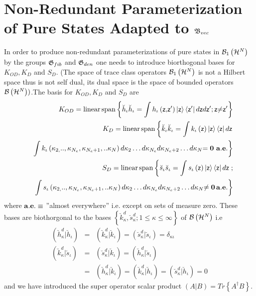 \section{Non-Redundant Parameterization of Pure States Adapted to ${\frak B}%
_{vec}$}

In order to produce non-redundant parameterizations of pure states in ${\cal %
B}_{1}\left( {\cal H}^{N}\right) $ by the groups ${\frak G}_{fib}$ and $%
{\frak G}_{den}$ one needs to introduce biorthogonal bases for $K_{OD},K_{D}$
and $S_{D}$. (The space of trace class operators ${\cal B}_{1}\left( {\cal H}%
^{N}\right) $ is not a Hilbert space thus is not self dual, its dual space
is the space of bounded operators ${\cal B}\left( {\cal H}^{N}\right) )$.The
basis for $K_{OD},K_{D}$ and $S_{D}$ are 
\begin{eqnarray}
&&K_{OD}={\rm linear\,span}\left\{ \breve{h}_{\iota }\breve{h}_{\iota }=\int
h_{\iota }\left( {\sf z}{\bf ,}{\sf z}^{\prime }\right) \left| {\sf z}%
\right\rangle \left\langle {\sf z}^{\prime }\right| d{\sf z}d{\sf z}^{\prime
};{\sf z}{\bf \neq }{\sf z}^{\prime }\right\} \\
&&K_{D}={\rm linear\,span}\left\{ \breve{k}_{\iota }\breve{k}_{\iota }=\int
k_{\iota }\left( {\sf z}\right) \left| {\sf z}\right\rangle \left\langle 
{\sf z}\right| d{\sf z}\right.  \nonumber \\
&&\left. \int k_{\iota }\left( \kappa _{2,}..,\kappa _{N_{e}},\kappa
_{N_{e}+1},..\kappa _{N}\right) d\kappa _{2}\ldots d\kappa _{N_{e}}d\kappa
_{N_{e}+2}\ldots d\kappa _{N}{\bf =0}\text{ }{\bf a.e.}\right\}
\label{kbasis} \\
&&S_{D}={\rm linear\,span}\left\{ \breve{s}_{\iota }\breve{s}_{\iota }=\int
s_{\iota }\left( {\sf z}\right) \left| {\sf z}\right\rangle \left\langle 
{\sf z}\right| d{\sf z}\right. ;  \nonumber \\
&&\left. \int s_{\iota }\left( \kappa _{2,}..,\kappa _{N_{e}},\kappa
_{N_{e}+1},..\kappa _{N}\right) d\kappa _{2}\ldots d\kappa _{N_{e}}d\kappa
_{N_{e}+2}\ldots d\kappa _{N}{\bf \neq 0\,a.e.}\right\}  \label{sbasis}
\end{eqnarray}%
where ${\bf a.e.\equiv }$ ''almost everywhere'' i.e. except on sets of
measure zero. These bases are biothorgonal to the bases $\left\{ \breve{k}%
_{\kappa }^{d},\breve{s}_{\kappa }^{d};1\leq \kappa \leq \infty \right\} $
of ${\cal B}\left( {\cal H}^{N}\right) $ i.e 
\begin{eqnarray}
\left( \breve{h}_{\kappa }^{d}|\breve{h}_{\iota }\right) &=&\left( \breve{k}%
_{\kappa }^{d}|\breve{k}_{\iota }\right) =\left( \breve{s}_{\kappa }^{d}|%
\breve{s}_{\iota }\right) =\delta _{\kappa \iota }  \nonumber \\
\left( \breve{k}_{\kappa }^{d}|\breve{s}_{\iota }\right) &=&\left( \breve{s}%
_{\kappa }^{d}|\breve{k}_{\iota }\right) =\left( \breve{h}_{\kappa }^{d}|%
\breve{s}_{\iota }\right)  \nonumber \\
&=&\left( \breve{h}_{\kappa }^{d}|\breve{k}_{\iota }\right) =\left( \breve{k}%
_{\kappa }^{d}|\breve{h}_{\iota }\right) =\left( \breve{s}_{\kappa }^{d}|%
\breve{h}_{\iota }\right) =0
\end{eqnarray}%
and we have introduced the super operator scalar product $\left( A|B\right)
=Tr\left\{ A^{\dagger }B\right\} $.


